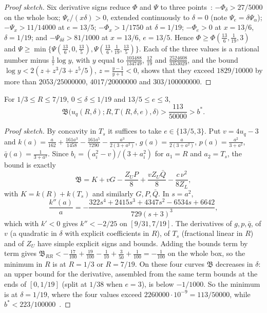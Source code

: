 \begin{proof}[Proof sketch]
Six derivative signs reduce $\Phi$ and $\Psi$ to three points~\cite{LighterProofs}:
$-\Phi_\delta>27/5000$ on the whole box; $\Psi_e/(x\delta)>0$, extended continuously to
$\delta=0$ (note $\Psi_e=\delta\Psi_\alpha$); $-\Psi_x>11/14000$ at $e=13/5$; $-\Phi_x>1/1750$ at
$\delta=1/19$; $-\Phi_e>0$ at $x=13/6$, $\delta=1/19$; and $-\Psi_{\delta\delta}>81/1000$ at
$x=13/6$, $e=13/5$. Hence $\Phi\ge\Phi(\frac{13}6,\frac1{19},3)$ and
$\Psi\ge\min\{\Psi(\frac{13}6,0,\frac{13}5),\Psi(\frac{13}6,\frac1{19},\frac{13}5)\}$. Each of
the three values is a rational number minus $\frac17\log y$, with $y$ equal to
$\frac{103488}{134749}$, $\frac{12}{19}$ and $\frac{2524608}{3353029}$, and the bound
$\log y<2(z+z^3/3+z^5/5)$, $z=\frac{y-1}{y+1}<0$, shows that they exceed $1829/10000$ by more than
$2053/25000000$, $4017/20000000$ and $303/100000000$.
\end{proof}

\begin{proposition}\label{prop:ss-face-S6}
For $1/3\le R\le7/19$, $0\le\delta\le1/19$ and $13/5\le e\le3$,
\[
  \mathfrak B\bigl(u_q(R,\delta);R,T(R,\delta,e),\delta\bigr)>\frac{113}{50000}>b^* .
\]
\end{proposition}

\begin{proof}[Proof sketch]
By concavity in $T_s$ it suffices to take $e\in\{13/5,3\}$. Put $v=4u_q-3$ and
$k(a)=\frac a{162}+\frac{161a^3}{1458}-\frac{161a^5}{7290}-\frac{a^3}{2(3+a^2)}$,
$g(a)=\frac a{2(3+a^2)}$, $p(a)=\frac{a^2}{3+a^2}$, $\bar q(a)=\frac1{3+a^2}$. Since
$b_i=(a_i^2-v)/(3+a_i^2)$ for $a_1=R$ and $a_2=T_s$, the bound is exactly
\[
  \mathfrak B=K+vG-\frac{Z_UP}{8}+\frac{vZ_U\bar Q}{8}-\frac{c\,\nu^2}{8Z_L},
\]
with $K=k(R)+k(T_s)$ and similarly $G,P,\bar Q$. In $s=a^2$,
\[
  \frac{k''(a)}a=-\frac{322s^4+2415s^3+4347s^2-6534s+6642}{729(s+3)^3},
\]
which with $k'<0$ gives $k''<-2/25$ on $[9/31,7/19]$. The derivatives of $g,p,\bar q$, of $v$ (a
quadratic in $\delta$ with explicit coefficients in $R$), of $T_s$ (fractional linear in $R$) and
of $Z_U$ have simple explicit signs and bounds. Adding the bounds term by term gives
$\mathfrak B_{RR}<-\frac{17}{100}+\frac{19}{100}-\frac1{10}+\frac3{50}+\frac1{100}=-\frac1{100}$
on the whole box, so the minimum in $R$ is at $R=1/3$ or $R=7/19$. On these four curves
$\mathfrak B$ decreases in $\delta$: an upper bound for the derivative, assembled from the same
term bounds at the ends of $[0,1/19]$ (split at $1/38$ when $e=3$), is below $-1/1000$. So the
minimum is at $\delta=1/19$, where the four values exceed $2260000\cdot10^{-9}=113/50000$, while
$b^*<223/100000$~\cite{LighterProofs}.
\end{proof}
